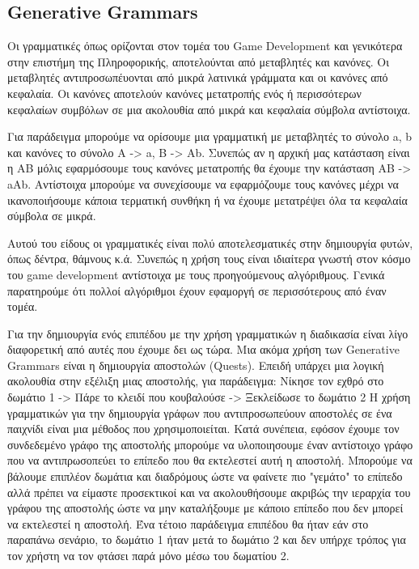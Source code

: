 \subsection{Generative Grammars}
Οι γραμματικές όπως ορίζονται στον τομέα του Game Development και γενικότερα στην επιστήμη της Πληροφορικής, αποτελούνται από μεταβλητές και κανόνες. Οι μεταβλητές αντιπροσωπέυονται από μικρά λατινικά γράμματα και οι κανόνες από κεφαλαία. Οι κανόνες αποτελούν κανόνες μετατροπής ενός ή περισσότερων κεφαλαίων συμβόλων σε μια ακολουθία από μικρά και κεφαλαία σύμβολα αντίστοιχα.
\par 
Για παράδειγμα μπορούμε να ορίσουμε μια γραμματική με μεταβλητές το σύνολο {a, b} και κανόνες το σύνολο {Α -> a, B -> Ab}. Συνεπώς αν η αρχική μας κατάσταση είναι η {ΑΒ} μόλις εφαρμόσουμε τους κανόνες μετατροπής θα έχουμε την κατάσταση {ΑΒ} -> {aΑb}. Αντίστοιχα μπορούμε να συνεχίσουμε να εφαρμόζουμε τους κανόνες μέχρι να ικανοποιήσουμε κάποια τερματική συνθήκη ή να έχουμε μετατρέψει όλα τα κεφαλαία σύμβολα σε μικρά.
\par
Αυτού του είδους οι γραμματικές είναι πολύ αποτελεσματικές στην δημιουργία φυτών, όπως δέντρα, θάμνους κ.ά. Συνεπώς η χρήση τους είναι ιδιαίτερα γνωστή στον κόσμο του game development αντίστοιχα με τους προηγούμενους αλγόριθμους. Γενικά παρατηρούμε ότι πολλοί αλγόριθμοι έχουν εφαμοργή σε περισσότερους από έναν τομέα.
\par
Για την δημιουργία ενός επιπέδου με την χρήση γραμματικών η διαδικασία είναι λίγο διαφορετική από αυτές που έχουμε δει ως τώρα. Μια ακόμα χρήση των Generative Grammars είναι η δημιουργία αποστολών (Quests). Επειδή υπάρχει μια λογική ακολουθία στην εξέλιξη μιας αποστολής, για παράδειγμα:
\newline
Νίκησε τον εχθρό στο δωμάτιο 1 -> Πάρε το κλειδί που κουβαλούσε -> Ξεκλείδωσε το δωμάτιο 2 
\newline
Η χρήση γραμματικών για την δημιουργία γράφων που αντιπροσωπεύουν αποστολές σε ένα παιχνίδι είναι μια μέθοδος που χρησιμοποιείται. Κατά συνέπεια, εφόσον έχουμε τον συνδεδεμένο γράφο της αποστολής μπορούμε να υλοποιησουμε έναν αντίστοιχο γράφο που να αντιπρωσοπεύει το επίπεδο που θα εκτελεστεί αυτή η αποστολή. Μπορούμε να βάλουμε επιπλέον δωμάτια και διαδρόμους ώστε να φαίνετε πιο "γεμάτο" το επίπεδο αλλά πρέπει να είμαστε προσεκτικοί και να ακολουθήσουμε ακριβώς την ιεραρχία του γράφου της αποστολής ώστε να μην καταλήξουμε με κάποιο επίπεδο που δεν μπορεί να εκτελεστεί η αποστολή. Ένα τέτοιο παράδειγμα επιπέδου θα ήταν εάν στο παραπάνω σενάριο, το δωμάτιο 1 ήταν μετά το δωμάτιο 2 και δεν υπήρχε τρόπος για τον χρήστη να τον φτάσει παρά μόνο μέσω του δωματίου 2.
